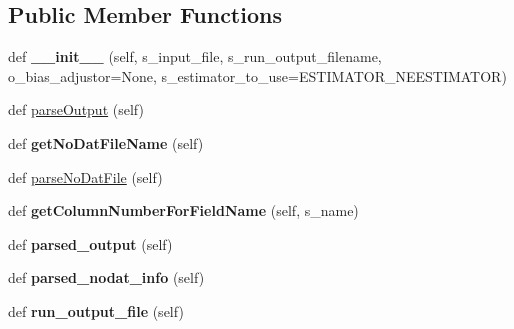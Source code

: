 \subsection*{Public Member Functions}
\begin{DoxyCompactItemize}
\item 
def {\bfseries \+\_\+\+\_\+init\+\_\+\+\_\+} (self, s\+\_\+input\+\_\+file, s\+\_\+run\+\_\+output\+\_\+filename, o\+\_\+bias\+\_\+adjustor=None, s\+\_\+estimator\+\_\+to\+\_\+use=E\+S\+T\+I\+M\+A\+T\+O\+R\+\_\+\+N\+E\+E\+S\+T\+I\+M\+A\+T\+OR)\hypertarget{classnegui_1_1pgoutputneestimator_1_1PGOutputNeEstimator_a83a6befe7f70678330a2395b05924174}{}\label{classnegui_1_1pgoutputneestimator_1_1PGOutputNeEstimator_a83a6befe7f70678330a2395b05924174}

\item 
def \hyperlink{classnegui_1_1pgoutputneestimator_1_1PGOutputNeEstimator_a7b6885cf565cb604ab24d7082858f57b}{parse\+Output} (self)
\item 
def {\bfseries get\+No\+Dat\+File\+Name} (self)\hypertarget{classnegui_1_1pgoutputneestimator_1_1PGOutputNeEstimator_a10c975df76c0f893c4814cf0b492cae6}{}\label{classnegui_1_1pgoutputneestimator_1_1PGOutputNeEstimator_a10c975df76c0f893c4814cf0b492cae6}

\item 
def \hyperlink{classnegui_1_1pgoutputneestimator_1_1PGOutputNeEstimator_a4f8192c2aacf6e38b2c4c1d80302b643}{parse\+No\+Dat\+File} (self)
\item 
def {\bfseries get\+Column\+Number\+For\+Field\+Name} (self, s\+\_\+name)\hypertarget{classnegui_1_1pgoutputneestimator_1_1PGOutputNeEstimator_a9f13fc3000c3018a20fb38f37c5d9594}{}\label{classnegui_1_1pgoutputneestimator_1_1PGOutputNeEstimator_a9f13fc3000c3018a20fb38f37c5d9594}

\item 
def {\bfseries parsed\+\_\+output} (self)\hypertarget{classnegui_1_1pgoutputneestimator_1_1PGOutputNeEstimator_ae97f8f35f02d9026bc1796daa3ed7aca}{}\label{classnegui_1_1pgoutputneestimator_1_1PGOutputNeEstimator_ae97f8f35f02d9026bc1796daa3ed7aca}

\item 
def {\bfseries parsed\+\_\+nodat\+\_\+info} (self)\hypertarget{classnegui_1_1pgoutputneestimator_1_1PGOutputNeEstimator_a9842661b1a2ff8f5b0fb95cdbf45c1f9}{}\label{classnegui_1_1pgoutputneestimator_1_1PGOutputNeEstimator_a9842661b1a2ff8f5b0fb95cdbf45c1f9}

\item 
def {\bfseries run\+\_\+output\+\_\+file} (self)\hypertarget{classnegui_1_1pgoutputneestimator_1_1PGOutputNeEstimator_a5e510dccae0f66ae63f86d46e6c46a36}{}\label{classnegui_1_1pgoutputneestimator_1_1PGOutputNeEstimator_a5e510dccae0f66ae63f86d46e6c46a36}


\end{DoxyCompactItemize}
